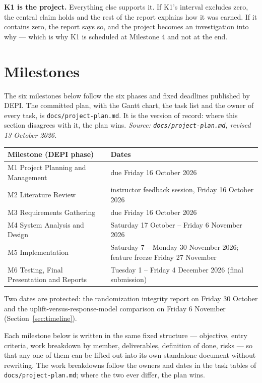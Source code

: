 \documentclass[11pt,a4paper]{article}
\newcommand{\srcnote}[1]{{\footnotesize\itshape\color{teal}Source: #1}}
\begin{document}
\begin{alertbox}
\textbf{K1 is the project.} Everything else supports it. If K1's interval excludes zero, the central
claim holds and the rest of the report explains how it was earned. If it contains zero, the report
says so, and the project becomes an investigation into why --- which is why K1 is scheduled at
Milestone 4 and not at the end.
\end{alertbox}


\section{Milestones}
\label{sec:milestones}

\begin{keybox}
The six milestones below follow the six phases and fixed deadlines published by DEPI. The
committed plan, with the Gantt chart, the task list and the owner of every task, is
\texttt{docs/project-plan.md}. It is the version of record: where this section disagrees with it,
the plan wins.
\srcnote{\texttt{docs/project-plan.md}, revised 13 October 2026.}

\smallskip
\begin{tabularx}{\linewidth}{@{}L{5.6cm}X@{}}
\toprule
\textbf{Milestone (DEPI phase)} & \textbf{Dates} \\
\midrule
M1 Project Planning and Management & due Friday 16 October 2026 \\
M2 Literature Review & instructor feedback session, Friday 16 October 2026 \\
M3 Requirements Gathering & due Friday 16 October 2026 \\
M4 System Analysis and Design & Saturday 17 October -- Friday 6 November 2026 \\
M5 Implementation & Saturday 7 -- Monday 30 November 2026; feature freeze Friday 27 November \\
M6 Testing, Final Presentation and Reports & Tuesday 1 -- Friday 4 December 2026 (final
submission) \\
\bottomrule
\end{tabularx}
\smallskip

Two dates are protected: the randomization integrity report on Friday 30 October and the
uplift-versus-response-model comparison on Friday 6 November (Section~\ref{sec:timeline}).

Each milestone below is written in the same fixed structure --- objective, entry criteria, work
breakdown by member, deliverables, definition of done, risks --- so that any one of them can be
lifted out into its own standalone document without rewriting. The work breakdowns follow the
owners and dates in the task tables of \texttt{docs/project-plan.md}; where the two ever differ,
the plan wins.
\end{keybox}
\end{document}
